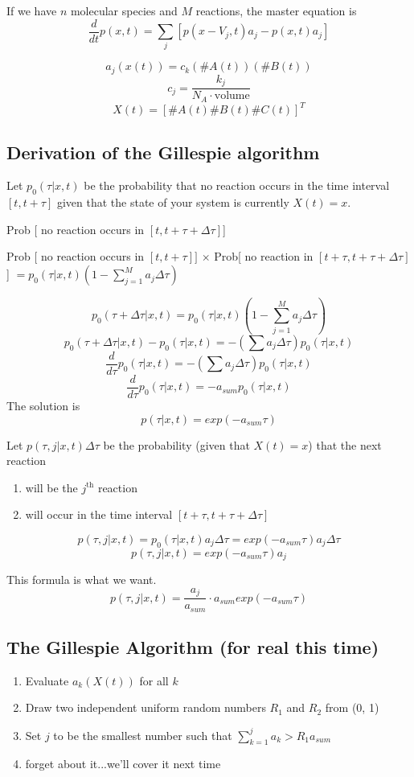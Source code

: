 \documentclass[10pt]{article}
\newenvironment{menumerate}
{
  \begin{enumerate}
  \setlength{\itemsep}{1pt}
  \setlength{\parskip}{0pt}
  \setlength{\parsep}{0pt}}{\end{enumerate}
}
\begin{document}
If we have $n$ molecular species and $M$ reactions, the master equation is \[ \frac{d}{dt}p(x,t) = \sum_j\left[ p(x-V_j, t)a_j - p(x,t)a_j \right] \]

\[ a_j(x(t)) = c_k(\#A(t))(\#B(t)) \]
\[ c_j = \frac{k_j}{N_A \cdot \text{volume}} \]
\[ X(t) = [\#A(t) \#B(t) \#C(t)]^T \]

\subsection*{Derivation of the Gillespie algorithm}
Let $p_0(\tau | x, t)$ be the probability that no reaction occurs in the time interval $[t, t+\tau]$ given that the state of your system is currently $X(t) = x$.

Prob [ no reaction occurs in $[t, t+\tau+\Delta\tau]$]

Prob [ no reaction occurs in $[t, t+\tau]]$ $\times$ Prob[ no reaction in $[t+\tau, t+\tau+\Delta\tau]$] $= p_0(\tau | x,t)\left( 1 - \sum_{j=1}^{M}a_j\Delta \tau \right)$

\[ p_0(\tau + \Delta \tau | x, t) = p_0(\tau | x, t)\left( 1 - \sum_{j=1}^{M}a_j\Delta\tau \right) \]
\[ p_0(\tau + \Delta \tau | x, t) - p_0(\tau | x, t) = -\left( \sum a_j \Delta\tau \right)p_0(\tau | x,t) \]
\[ \frac{d}{d\tau}p_0(\tau | x,t) = -\left( \sum a_j \Delta\tau \right)p_0(\tau | x,t) \]
\[ \frac{d}{d\tau}p_0(\tau | x,t) = -a_{sum}p_0(\tau | x,t) \]
The solution is \[ p(\tau | x,t) = exp(-a_{sum}\tau) \]

Let $p(\tau,j | x,t)\Delta \tau$ be the probability (given that $X(t) = x$) that the next reaction
\begin{menumerate}
  \item will be the $j^{\text{th}}$ reaction
  \item will occur in the time interval $[t+\tau,t+\tau+\Delta\tau]$
\end{menumerate}

\[ p(\tau,j|x,t) = p_0(\tau | x,t)a_j\Delta\tau = exp(-a_{sum}\tau)a_j \Delta\tau \]
\[ p(\tau,j|x,t) = exp(-a_{sum}\tau)a_j  \]

This formula is what we want.
\[ p(\tau,j|x,t) = \frac{a_j}{a_{sum}}\cdot a_{sum}exp(-a_{sum}\tau) \]

\subsection*{The Gillespie Algorithm (for real this time)}
\begin{menumerate}
  \item Evaluate $a_k(X(t))$ for all $k$
  \item Draw two independent uniform random numbers $R_1$ and $R_2$ from (0, 1)
  \item Set $j$ to be the smallest number such that $\sum_{k=1}^{j}a_k > R_1 a_{sum}$
  \item forget about it...we'll cover it next time
\end{menumerate}
\end{document}

